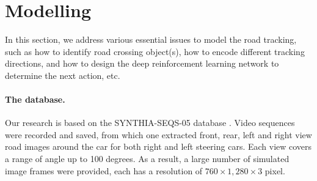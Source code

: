 \documentclass{svproc}
\begin{document}
	
	\section{Modelling}
	In this section, we address various essential issues to model the road tracking, such as how to identify road crossing object(s), how to encode different tracking directions, and how to design the deep reinforcement learning network to determine the next action, etc. 
	\paragraph{The database.} Our research is based on the SYNTHIA-SEQS-05 database \cite{Ros2016TheSYNTHIA}. Video sequences were recorded and saved, from which one extracted front, rear, left and right view road images around the car for both right and left steering cars. Each view covers a range of angle up to 100 degrees. As a result, a large number of simulated image frames were provided, each has a resolution of $760 \times 1,280 \times 3$ pixel. 
	
\end{document}
